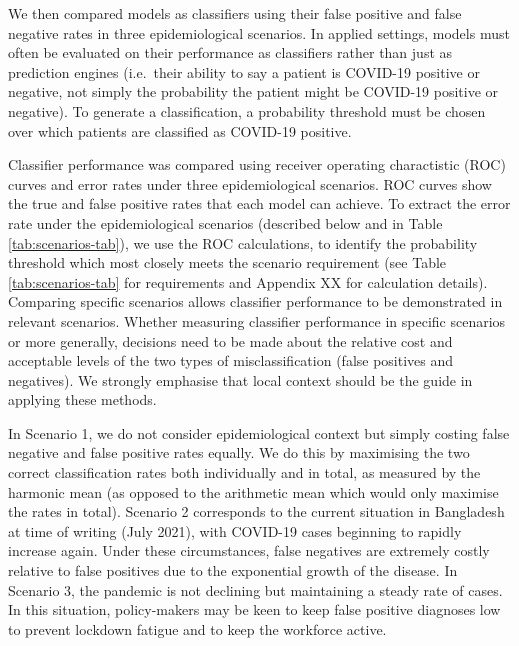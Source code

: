 \documentclass[]{elsarticle} %
\begin{document}
We then compared models as classifiers using their false positive and false negative rates in three epidemiological scenarios.
In applied settings, models must often be evaluated on their performance as classifiers rather than just as prediction engines (i.e.~their ability to say a patient is COVID-19 positive or negative, not simply the probability the patient might be COVID-19 positive or negative).
To generate a classification, a probability threshold must be chosen over which patients are classified as COVID-19 positive.

Classifier performance was compared using receiver operating charactistic (ROC) curves and error rates under three epidemiological scenarios.
ROC curves show the true and false positive rates that each model can achieve.
To extract the error rate under the epidemiological scenarios (described below and in Table \ref{tab:scenarios-tab}), we use the ROC calculations, to identify the probability threshold which most closely meets the scenario requirement (see Table \ref{tab:scenarios-tab} for requirements and Appendix XX for calculation details).
Comparing specific scenarios allows classifier performance to be demonstrated in relevant scenarios.
Whether measuring classifier performance in specific scenarios or more generally, decisions need to be made about the relative cost and acceptable levels of the two types of misclassification (false positives and negatives).
We strongly emphasise that local context should be the guide in applying these methods.

In Scenario 1, we do not consider epidemiological context but simply costing false negative and false positive rates equally.
We do this by maximising the two correct classification rates both individually and in total, as measured by the harmonic mean (as opposed to the arithmetic mean which would only maximise the rates in total).
Scenario 2 corresponds to the current situation in Bangladesh at time of writing (July 2021), with COVID-19 cases beginning to rapidly increase again.
Under these circumstances, false negatives are extremely costly relative to false positives due to the exponential growth of the disease.
In Scenario 3, the pandemic is not declining but maintaining a steady rate of cases.
In this situation, policy-makers may be keen to keep false positive diagnoses low to prevent lockdown fatigue and to keep the workforce active.
\end{document}
